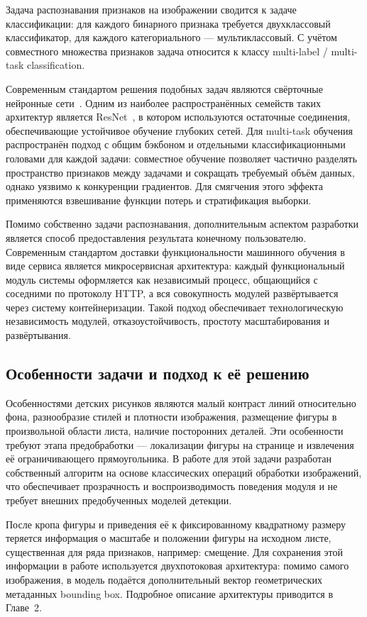 Задача распознавания признаков на изображении сводится к задаче классификации: для каждого бинарного признака требуется двухклассовый классификатор, для каждого категориального --- мультиклассовый. С учётом совместного множества признаков задача относится к классу multi-label / multi-task classification.

Современным стандартом решения подобных задач являются свёрточные нейронные сети~\cite{imagenet}. Одним из наиболее распространённых семейств таких архитектур является ResNet~\cite{resnet}, в котором используются остаточные соединения, обеспечивающие устойчивое обучение глубоких сетей. Для multi-task обучения распространён подход с общим бэкбоном и отдельными классификационными головами для каждой задачи: совместное обучение позволяет частично разделять пространство признаков между задачами и сокращать требуемый объём данных, однако уязвимо к конкуренции градиентов. Для смягчения этого эффекта применяются взвешивание функции потерь и стратификация выборки.

Помимо собственно задачи распознавания, дополнительным аспектом разработки является способ предоставления результата конечному пользователю. Современным стандартом доставки функциональности машинного обучения в виде сервиса является микросервисная архитектура: каждый функциональный модуль системы оформляется как независимый процесс, общающийся с соседними по протоколу HTTP, а вся совокупность модулей развёртывается через систему контейнеризации. Такой подход обеспечивает технологическую независимость модулей, отказоустойчивость, простоту масштабирования и развёртывания.

\subsection{Особенности задачи и подход к её решению}

Особенностями детских рисунков являются малый контраст линий относительно фона, разнообразие стилей и плотности изображения, размещение фигуры в произвольной области листа, наличие посторонних деталей. Эти особенности требуют этапа предобработки --- локализации фигуры на странице и извлечения её ограничивающего прямоугольника. В работе для этой задачи разработан собственный алгоритм на основе классических операций обработки изображений, что обеспечивает прозрачность и воспроизводимость поведения модуля и не требует внешних предобученных моделей детекции.

После кропа фигуры и приведения её к фиксированному квадратному размеру теряется информация о масштабе и положении фигуры на исходном листе, существенная для ряда признаков, например: смещение. Для сохранения этой информации в работе используется двухпотоковая архитектура: помимо самого изображения, в модель подаётся дополнительный вектор геометрических метаданных bounding box. Подробное описание архитектуры приводится в Главе~2.

